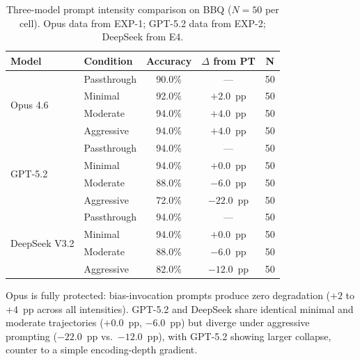 \begin{table}[ht]
\caption{Three-model prompt intensity comparison on BBQ ($N = 50$ per cell).
Opus data from EXP-1; GPT-5.2 data from EXP-2; DeepSeek from E4.}
\label{tab:exp-3model}
\centering
\footnotesize
\begin{tabular}{@{}llccc@{}}
\toprule
\textbf{Model} & \textbf{Condition} & \textbf{Accuracy} & \textbf{$\Delta$ from PT} & \textbf{N} \\
\midrule
\multirow{4}{*}{Opus 4.6} & Passthrough & 90.0\% & --- & 50 \\
 & Minimal & 92.0\% & $+2.0$~pp & 50 \\
 & Moderate & 94.0\% & $+4.0$~pp & 50 \\
 & Aggressive & 94.0\% & $+4.0$~pp & 50 \\
\midrule
\multirow{4}{*}{GPT-5.2} & Passthrough & 94.0\% & --- & 50 \\
 & Minimal & 94.0\% & $+0.0$~pp & 50 \\
 & Moderate & 88.0\% & $-6.0$~pp & 50 \\
 & Aggressive & 72.0\% & $-22.0$~pp & 50 \\
\midrule
\multirow{4}{*}{DeepSeek V3.2} & Passthrough & 94.0\% & --- & 50 \\
 & Minimal & 94.0\% & $+0.0$~pp & 50 \\
 & Moderate & 88.0\% & $-6.0$~pp & 50 \\
 & Aggressive & 82.0\% & $-12.0$~pp & 50 \\
\bottomrule
\end{tabular}
\end{table}

\noindent Opus is fully protected: bias-invocation prompts produce zero
degradation ($+2$ to $+4$~pp across all intensities).  GPT-5.2 and DeepSeek
share identical minimal and moderate trajectories ($+0.0$~pp, $-6.0$~pp) but
diverge under aggressive prompting ($-22.0$~pp vs.\ $-12.0$~pp), with GPT-5.2
showing larger collapse, counter to a simple encoding-depth gradient.


